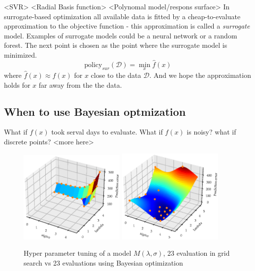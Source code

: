\begin{testexample}
    <SVR> <Radial Basis function> <Polynomal model/respons surface>
    In surrogate-based optimization all available data is fitted by a cheap-to-evaluate approximation
    to the objective function - this approximation is called a \textit{surrogate} model. Examples
    of surrogate models could be a neural network or a random forest. The next point is 
    chosen as the point where the surrogate model is minimized. 
    $$\text{policy}_{sur}(\mathcal{D}) = \min_x \hat f(x)$$
    where $\hat f(x) \approx f(x)$ for $x$ close to the data $\mathcal{D}$. And we hope the approximation
    holds for $x$ far away from the the data. \textbf{}
\end{testexample}

\subsection{When to use Bayesian optmization}
What if $f(x)$ took serval days to evaluate. What if $f(x)$ is noisy? what if discrete points? 
<more here>


\begin{figure}[H]%
    \centering
    {\includegraphics[width=0.46\textwidth]{Pictures/BO_vs_Grid2.eps} }%
    \qquad
   {\includegraphics[width=0.46\textwidth]{Pictures/BO_vs_Grid1.eps} }%
    \caption{Hyper parameter tuning of a model $M(\lambda, \sigma)$, 
    23 evaluation in grid search vs 23 evaluations using Bayesian optimization}%
    \label{fig:example}%
\end{figure}


